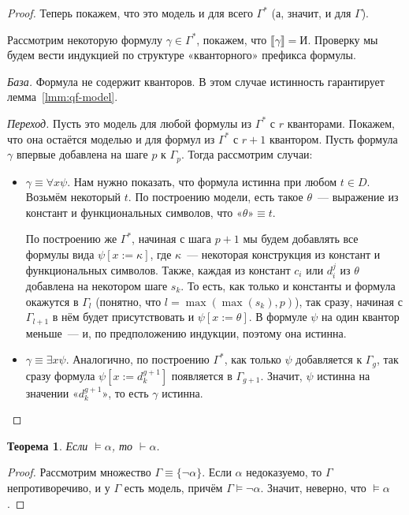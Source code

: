 \documentclass[a4paper,11pt]{article}
\newtheorem{thm}{Теорема}[section]
\theoremstyle{definition}
\newcommand{\proves}{\vdash}
\newcommand{\True}{\text{И}}
\newcommand{\gn}[1]{\text{«}#1\text{»}}
\begin{document}
\begin{proof}
Теперь покажем, что это модель и для всего $\Gamma^*$ (а, значит, и для
$\Gamma$).

Рассмотрим некоторую формулу $\gamma \in \Gamma^*$, покажем, что
$\llbracket\gamma\rrbracket = \True$. Проверку мы будем вести индукцией по
структуре «кванторного» префикса формулы.

\emph{База.} Формула не содержит кванторов. В этом случае истинность гарантирует
лемма~\ref{lmm:qf-model}.

\emph{Переход.} Пусть это модель для любой формулы из $\Gamma^*$ с $r$
кванторами. Покажем, что она остаётся моделью и для формул из $\Gamma^*$ с $r+1$
квантором. Пусть формула $\gamma$ впервые добавлена на шаге $p$ к $\Gamma_p$.
Тогда рассмотрим случаи:
\begin{itemize}
\item $\gamma \equiv \forall x\psi$. Нам нужно показать, что формула истинна при
  любом $t \in D$. Возьмём некоторый $t$. По построению модели, есть такое
  $\theta$~--- выражение из констант и функциональных символов, что $\gn{\theta}
  \equiv t$.

  По построению же $\Gamma^*$, начиная с шага $p+1$ мы будем добавлять все
  формулы вида $\psi[x := \kappa]$, где $\kappa$~--- некоторая конструкция из
  констант и функциональных символов. Также, каждая из констант $c_i$ или
  $d^j_i$ из $\theta$ добавлена на некотором шаге $s_k$. То есть, как только и
  константы и формула окажутся в $\Gamma_l$ (понятно, что $l = \max(\max(s_k),
  p)$), так сразу, начиная с $\Gamma_{l+1}$ в нём будет присутствовать и
  $\psi[x := \theta]$. В формуле $\psi$ на один квантор меньше~--- и, по
  предположению индукции, поэтому она истинна.
\item $\gamma \equiv \exists x\psi$. Аналогично, по построению $\Gamma^*$, как
  только $\psi$ добавляется к $\Gamma_g$, так сразу формула $\psi[x :=
  d^{g+1}_k]$ появляется в $\Gamma_{g+1}$. Значит, $\psi$ истинна на значении
  $\gn{d^{g+1}_k}$, то есть $\gamma$ истинна.
\end{itemize}
\end{proof}

\begin{thm}
Если $\models \alpha$, то $\proves \alpha$.
\end{thm}
\begin{proof}
Рассмотрим множество $\Gamma \equiv \{\neg\alpha\}$. Если $\alpha$ недоказуемо,
то $\Gamma$ непротиворечиво, и у $\Gamma$ есть модель, причём $\Gamma \models
\neg\alpha$. Значит, неверно, что $\models \alpha$.
\end{proof}
\end{document}
